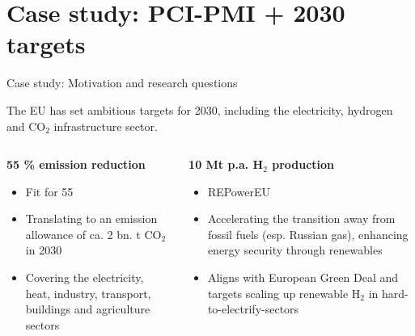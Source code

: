 \documentclass[10pt,aspectratio=169,dvipsnames]{beamer}
\begin{document}
\section{Case study: PCI-PMI + 2030 targets}
\begin{frame}{Case study: Motivation and research questions}
  \footnotesize

  The EU has set ambitious targets for 2030, including the electricity, hydrogen and CO$_2$ infrastructure sector.

  \begin{columns}[T] %
    \begin{column}{.3\textwidth}
        \begin{minipage}[t][.45\textheight]{\linewidth}
            \begin{alertblock}{\textbf{55 \% emission reduction}}
                \begin{itemize}
                  \item \alert{Fit for 55}
                  \item Translating to an emission allowance of ca. 2 bn. t CO$_2$ in 2030
                  \item Covering the electricity, heat, industry, transport, buildings and agriculture sectors \newline
                \end{itemize}
            \end{alertblock}
        \end{minipage}
    \end{column}
    
    \begin{column}{.34\textwidth}
        \begin{minipage}[t][.45\textheight]{\linewidth}
            \begin{exampleblock}{\textbf{10 Mt p.a. H$_2$ production}}
                \begin{itemize}
                  \item \alert{REPowerEU}
                  \item Accelerating the transition away from fossil fuels (esp. Russian gas), enhancing energy security through renewables
                  \item Aligns with European Green Deal and targets scaling up renewable H$_2$ in hard-to-electrify-sectors
                \end{itemize}
            \end{exampleblock}
        \end{minipage}
    \end{column}


\end{columns}
\end{frame}
\end{document}
